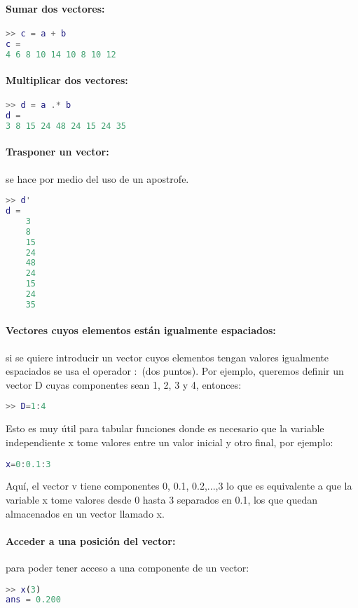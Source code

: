 \paragraph{Sumar dos vectores:}
\begin{lstlisting}[language=Matlab]
>> c = a + b
c =
4 6 8 10 14 10 8 10 12
\end{lstlisting}

\paragraph{Multiplicar dos vectores:}
\begin{lstlisting}[language=Matlab]
>> d = a .* b
d =
3 8 15 24 48 24 15 24 35
\end{lstlisting}

\paragraph{Trasponer un vector:} se hace por medio del uso de un apostrofe.
\begin{lstlisting}[language=Matlab]
>> d'
d =
	3 
	8 
	15 
	24 
	48 
	24 
	15 
	24 
	35
\end{lstlisting}


\paragraph{Vectores cuyos elementos están igualmente espaciados:}si se quiere introducir un vector cuyos elementos tengan valores igualmente espaciados se usa el operador $:$ (dos puntos). Por ejemplo, queremos definir un vector D cuyas componentes sean 1, 2, 3 y 4, entonces:
\begin{lstlisting}[language=Matlab]
>> D=1:4
\end{lstlisting}

Esto es muy útil para tabular funciones donde es necesario que la variable independiente x tome valores entre un valor inicial y otro final, por ejemplo:
\begin{lstlisting}[language=Matlab]
x=0:0.1:3
\end{lstlisting}

Aquí, el vector v tiene componentes 0, 0.1, 0.2,...,3 lo que es equivalente a que la variable x tome valores desde 0 hasta 3 separados en 0.1, los que quedan almacenados en un vector llamado x.

\paragraph{Acceder a una posición del vector:}para poder tener acceso a una componente de un vector:
\begin{lstlisting}[language=Matlab]
>> x(3)
ans = 0.200
\end{lstlisting}

